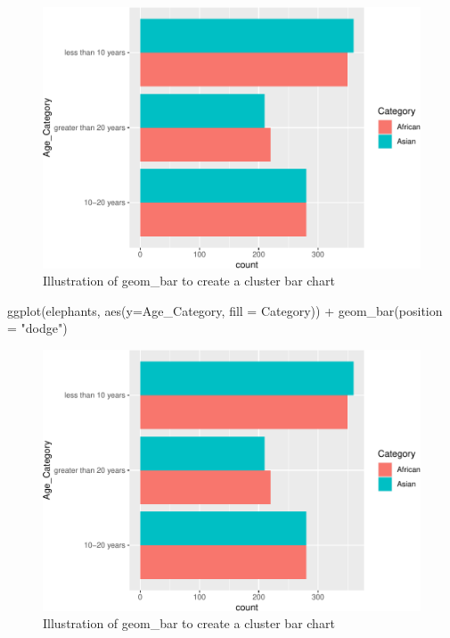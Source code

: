 \documentclass[
]{book}
\newenvironment{Shaded}{\begin{snugshade}}{\end{snugshade}}
\newcommand{\AttributeTok}[1]{\textcolor[rgb]{0.77,0.63,0.00}{#1}}
\newcommand{\FunctionTok}[1]{\textcolor[rgb]{0.00,0.00,0.00}{#1}}
\newcommand{\NormalTok}[1]{#1}
\newcommand{\SpecialCharTok}[1]{\textcolor[rgb]{0.00,0.00,0.00}{#1}}
\newcommand{\StringTok}[1]{\textcolor[rgb]{0.31,0.60,0.02}{#1}}
\begin{document}
\begin{figure}
\centering
\includegraphics{Data-Visualisation-geom-Encyclopedia_files/figure-latex/unnamed-chunk-20-1.pdf}
\caption{\label{fig:unnamed-chunk-20}Illustration of geom\_bar to create a cluster bar chart}
\end{figure}

\begin{Shaded}
\begin{Highlighting}[]
\FunctionTok{ggplot}\NormalTok{(elephants, }\FunctionTok{aes}\NormalTok{(}\AttributeTok{y=}\NormalTok{Age\_Category, }\AttributeTok{fill =}\NormalTok{ Category)) }\SpecialCharTok{+}
  \FunctionTok{geom\_bar}\NormalTok{(}\AttributeTok{position =} \StringTok{"dodge"}\NormalTok{)}
\end{Highlighting}
\end{Shaded}

\begin{figure}
\centering
\includegraphics{Data-Visualisation-geom-Encyclopedia_files/figure-latex/unnamed-chunk-21-1.pdf}
\caption{\label{fig:unnamed-chunk-21}Illustration of geom\_bar to create a cluster bar chart}
\end{figure}
\end{document}
